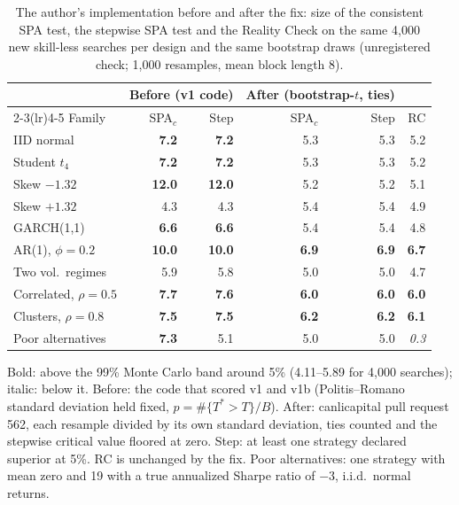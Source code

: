 \begin{table}[t]
\centering
\footnotesize
\setlength{\tabcolsep}{3.5pt}
\caption{The author's implementation before and after the fix: size of the consistent SPA test, the stepwise SPA test and the Reality Check on the same 4{,}000 new skill-less searches per design and the same bootstrap draws (unregistered check; 1{,}000 resamples, mean block length 8).}
\label{tab:fix}
\begin{tabular}{lrrrrr}
\toprule
 & \multicolumn{2}{c}{Before (v1 code)} & \multicolumn{2}{c}{After (bootstrap-$t$, ties)} & \multicolumn{1}{c}{} \\
\cmidrule(lr){2-3}\cmidrule(lr){4-5}
Family & SPA$_c$ & Step & SPA$_c$ & Step & RC \\
\midrule
IID normal & \textbf{7.2} & \textbf{7.2} & 5.3 & 5.3 & 5.2 \\
Student $t_4$ & \textbf{7.2} & \textbf{7.2} & 5.3 & 5.3 & 5.2 \\
Skew $-1.32$ & \textbf{12.0} & \textbf{12.0} & 5.2 & 5.2 & 5.1 \\
Skew $+1.32$ & 4.3 & 4.3 & 5.4 & 5.4 & 4.9 \\
GARCH(1,1) & \textbf{6.6} & \textbf{6.6} & 5.4 & 5.4 & 4.8 \\
AR(1), $\phi=0.2$ & \textbf{10.0} & \textbf{10.0} & \textbf{6.9} & \textbf{6.9} & \textbf{6.7} \\
Two vol.\ regimes & 5.9 & 5.8 & 5.0 & 5.0 & 4.7 \\
Correlated, $\rho=0.5$ & \textbf{7.7} & \textbf{7.6} & \textbf{6.0} & \textbf{6.0} & \textbf{6.0} \\
Clusters, $\rho=0.8$ & \textbf{7.5} & \textbf{7.5} & \textbf{6.2} & \textbf{6.2} & \textbf{6.1} \\
Poor alternatives & \textbf{7.3} & 5.1 & 5.0 & 5.0 & \textit{0.3} \\
\bottomrule
\end{tabular}
\par\smallskip\begin{minipage}{0.97\linewidth}\footnotesize Bold: above the 99\% Monte Carlo band around 5\% (4.11--5.89 for 4{,}000 searches); italic: below it. Before: the code that scored v1 and v1b (Politis--Romano standard deviation held fixed, $p=\#\{T^*>T\}/B$). After: canlicapital pull request 562, each resample divided by its own standard deviation, ties counted and the stepwise critical value floored at zero. Step: at least one strategy declared superior at 5\%. RC is unchanged by the fix. Poor alternatives: one strategy with mean zero and 19 with a true annualized Sharpe ratio of $-3$, i.i.d.\ normal returns.\end{minipage}
\end{table}

